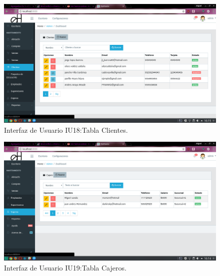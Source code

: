 \begin{figure}[htbp!]
	\begin{center}
\includegraphics[width=\textwidth]{Pantallas/tablaClientes}
		\caption{Interfaz de Usuario IU18:Tabla Clientes.}
	\end{center}
\end{figure}



\begin{figure}[htbp!]
	\begin{center}
\includegraphics[width=\textwidth]{Pantallas/tablaCajeros}
		\caption{Interfaz de Usuario IU19:Tabla Cajeros.}
	\end{center}
\end{figure}
